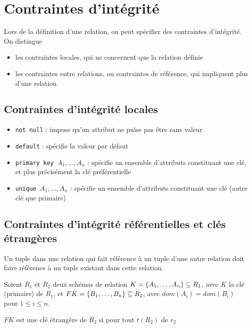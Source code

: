 	\section{Contraintes d'intégrité}
	
	Lors de la définition d'une relation, on peut spécifier des contraintes d'intégrité. On distingue
	
	\begin{itemize}
		\item les contraintes locales, qui ne concernent que la relation définie
		\item les contraintes entre relations, ou contraintes de référence, qui impliquent plus d'une relation
	\end{itemize}
	
	
		\subsection{Contraintes d'intégrité locales}
		
		\begin{itemize}
			\item \texttt{not null} : impose qu'un attribut ne puise pas être sans valeur
			\item \texttt{default} : spécifie la valeur par défaut
			\item \texttt{primary key $A_1, \dots , A_n$} : spécifie un ensemble d'attributs constituant une clé, et plus précisément la clé préférentielle
			\item \texttt{unique $A_1, \dots , A_n$} : spécifie un ensemble d'attributs constituant une clé (autre clé que primaire)
		\end{itemize}
		
		\subsection{Contraintes d'intégrité référentielles et clés étrangères}
		
		Un tuple dans une relation qui fait référence à un tuple d'une autre relation doit faire référence à un tuple existant dans cette relation.
		
		Soient $R_1$ et $R_2$ deux schémas de relation $K = \lbrace A_1, \dots,  A_n \rbrace \subseteq R_1$, avec $K$ la clé (primaire) de $R_1$, et $FK = \lbrace B_1, \dots,  B_n \rbrace \subseteq R_2$, avec $dom(A_i) = dom(B_i)$ pour $1 \leq i \leq n$.
		
		$FK$ est une clé étrangère de $R_2$ si pour tout $t(R_2)$ de $r_2$
		

